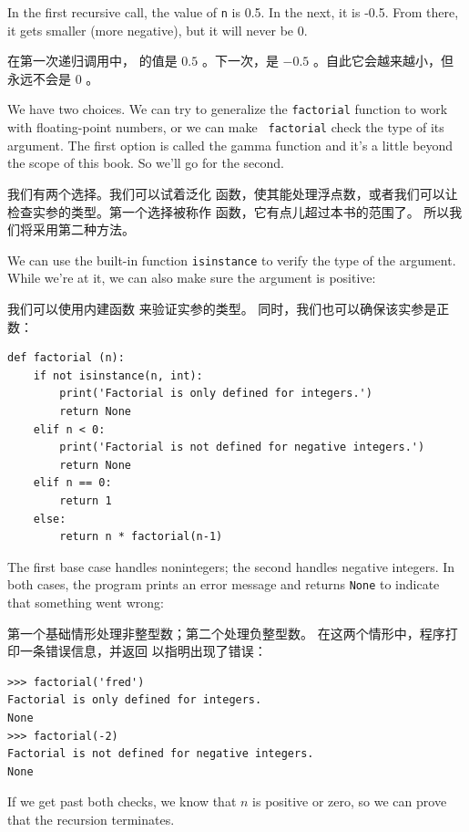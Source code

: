 In the first recursive call, the value of {\tt n} is 0.5.
In the next, it is -0.5.  From there, it gets smaller
(more negative), but it will never be 0.

在第一次递归调用中， 的值是 $0.5$ 。下一次，是 $-0.5$ 。自此它会越来越小，但永远不会是 $0$ 。

We have two choices.  We can try to generalize the {\tt factorial}
function to work with floating-point numbers, or we can make {\tt
  factorial} check the type of its argument.  The first option is
called the gamma function and it's a
little beyond the scope of this book.  So we'll go for the second.

我们有两个选择。我们可以试着泛化  函数，使其能处理浮点数，或者我们可以让  检查实参的类型。第一个选择被称作  函数，它有点儿超过本书的范围了。 所以我们将采用第二种方法。

We can use the built-in function {\tt isinstance} to verify the type
of the argument.  While we're at it, we can also make sure the
argument is positive:

我们可以使用内建函数  来验证实参的类型。 同时，我们也可以确保该实参是正数：
  

\begin{lstlisting}
def factorial (n):
    if not isinstance(n, int):
        print('Factorial is only defined for integers.')
        return None
    elif n < 0:
        print('Factorial is not defined for negative integers.')
        return None
    elif n == 0:
        return 1
    else:
        return n * factorial(n-1)
\end{lstlisting}

%
The first base case handles nonintegers; the
second handles negative integers.  In both cases, the program prints
an error message and returns {\tt None} to indicate that something
went wrong:

第一个基础情形处理非整型数；第二个处理负整型数。
在这两个情形中，程序打印一条错误信息，并返回  以指明出现了错误：


\begin{lstlisting}
>>> factorial('fred')
Factorial is only defined for integers.
None
>>> factorial(-2)
Factorial is not defined for negative integers.
None
\end{lstlisting}

%
If we get past both checks, we know that $n$ is positive or
zero, so we can prove that the recursion terminates.

